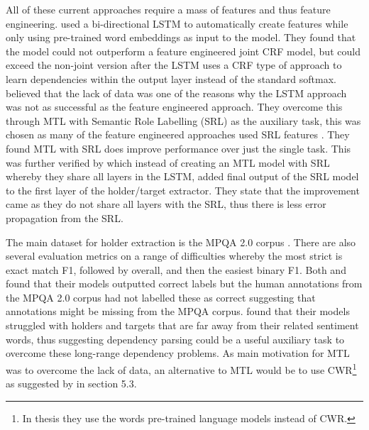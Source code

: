 All of these current approaches require a mass of features and thus feature engineering. \citet{katiyar-cardie-2016-investigating} used a bi-directional LSTM to automatically create features while only using pre-trained word embeddings as input to the model. They found that the model could not outperform a feature engineered joint CRF model, but could exceed the non-joint version after the LSTM uses a CRF type of approach to learn dependencies within the output layer instead of the standard softmax. \citet{marasovic-frank-2018-srl4orl} believed that the lack of data was one of the reasons why the LSTM approach was not as successful as the feature engineered approach. They overcome this through MTL with Semantic Role Labelling (SRL) as the auxiliary task, this was chosen as many of the feature engineered approaches used SRL features \citep{choi-etal-2005-identifying, johansson-moschitti-2010-reranking, yang-cardie-2013-joint}. They found MTL with SRL does improve performance over just the single task. This was further verified by \citet{zhang-etal-2019-enhancing} which instead of creating an MTL model with SRL whereby they share all layers in the LSTM, added final output of the SRL model to the first layer of the holder/target extractor. They state that the improvement came as they do not share all layers with the SRL, thus there is less error propagation from the SRL. 

The main dataset for holder extraction is the MPQA 2.0 corpus \citep{wiebe2005annotating}. There are also several evaluation metrics on a range of difficulties whereby the most strict is exact match F1, followed by overall, and then the easiest binary F1. Both \citet{katiyar-cardie-2016-investigating} and \citet{marasovic-frank-2018-srl4orl} found that their models outputted correct labels but the human annotations from the MPQA 2.0 corpus had not labelled these as correct suggesting that annotations might be missing from the MPQA corpus. \citet{marasovic-frank-2018-srl4orl} found that their models struggled with holders and targets that are far away from their related sentiment words, thus suggesting dependency parsing could be a useful auxiliary task to overcome these long-range dependency problems. As \citet{marasovic-frank-2018-srl4orl} main motivation for MTL was to overcome the lack of data, an alternative to MTL would be to use CWR\footnote{In \citet{marasovic2020deep} thesis they use the words pre-trained language models instead of CWR.} as suggested by \citet{marasovic2020deep} in section 5.3.

